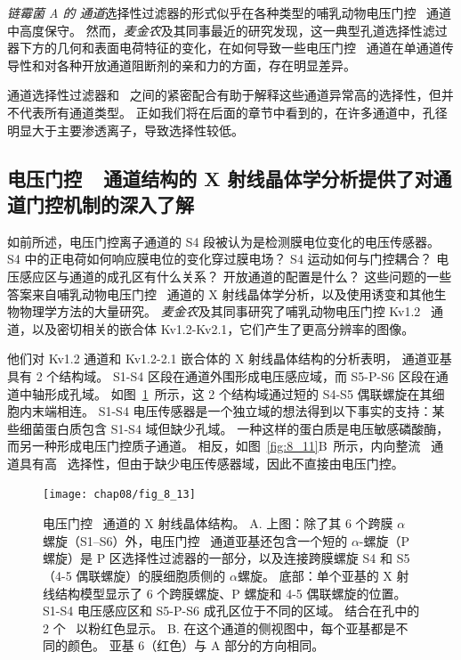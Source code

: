 \textit{链霉菌 A 的  通道}选择性过滤器的形式似乎在各种类型的哺乳动物电压门控~ 通道中高度保守。
然而，\textit{麦金农}及其同事最近的研究发现，这一典型孔道选择性滤过器下方的几何和表面电荷特征的变化，在如何导致一些电压门控~ 通道在单通道传导性和对各种开放通道阻断剂的亲和力的方面，存在明显差异。


 通道选择性过滤器和~ 之间的紧密配合有助于解释这些通道异常高的选择性，但并不代表所有通道类型。
正如我们将在后面的章节中看到的，在许多通道中，孔径明显大于主要渗透离子，导致选择性较低。



\subsection{电压门控~~通道结构的 X 射线晶体学分析提供了对通道门控机制的深入了解}

如前所述，电压门控离子通道的 S4 段被认为是检测膜电位变化的电压传感器。
S4 中的正电荷如何响应膜电位的变化穿过膜电场？
S4 运动如何与门控耦合？
电压感应区与通道的成孔区有什么关系？
开放通道的配置是什么？
这些问题的一些答案来自哺乳动物电压门控~ 通道的 X 射线晶体学分析，以及使用诱变和其他生物物理学方法的大量研究。
\textit{麦金农}及其同事研究了哺乳动物电压门控 Kv1.2~ 通道，以及密切相关的嵌合体 Kv1.2-Kv2.1，它们产生了更高分辨率的图像。


他们对 Kv1.2 通道和 Kv1.2-2.1 嵌合体的 X 射线晶体结构的分析表明， 通道亚基具有 2 个结构域。
S1-S4 区段在通道外围形成电压感应域，而 S5-P-S6 区段在通道中轴形成孔域。
如图~\ref{fig:8_13}~所示，这 2 个结构域通过短的 S4-S5 偶联螺旋在其细胞内末端相连。
S1-S4 电压传感器是一个独立域的想法得到以下事实的支持：某些细菌蛋白质包含 S1-S4 域但缺少孔域。
一种这样的蛋白质是电压敏感磷酸酶，而另一种形成电压门控质子通道。
相反，如图~\ref{fig:8_11}B~所示，内向整流~ 通道具有高~ 选择性，但由于缺少电压传感器域，因此不直接由电压门控。


\begin{figure}[htbp]
	\centering
	\texttt{[image: chap08/fig\_8\_13]}
	\caption{电压门控~ 通道的 X 射线晶体结构\cite{long2007atomic}。
		A. 上图：除了其 6 个跨膜 $\alpha$ 螺旋（S1–S6）外，电压门控~ 通道亚基还包含一个短的 $\alpha$-螺旋（P 螺旋）是 P 区选择性过滤器的一部分，以及连接跨膜螺旋 S4 和 S5（4-5 偶联螺旋）的膜细胞质侧的 $\alpha$螺旋。
		底部：单个亚基的 X 射线结构模型显示了 6 个跨膜螺旋、P 螺旋和 4-5 偶联螺旋的位置。
		S1-S4 电压感应区和 S5-P-S6 成孔区位于不同的区域。
		结合在孔中的 2 个~ 以粉红色显示。
		B. 在这个通道的侧视图中，每个亚基都是不同的颜色。
		亚基 6（红色）与 A 部分的方向相同。}
	\label{fig:8_13}
\end{figure}


